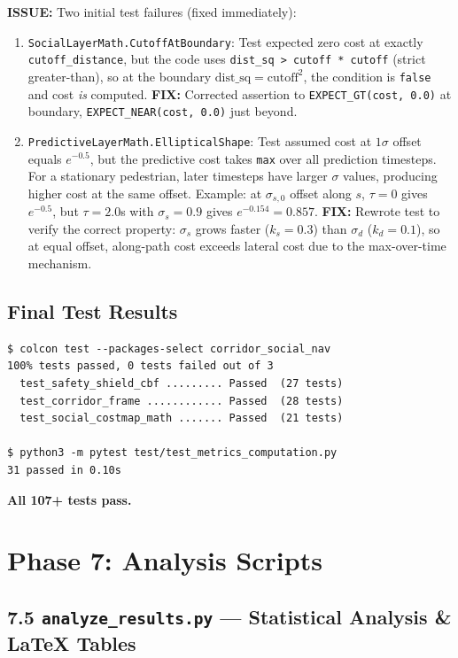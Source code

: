 \documentclass[11pt]{article}
\newcommand{\logentry}[1]{\subsection*{#1}}
\newcommand{\issue}[1]{\textcolor{issuered}{\textbf{ISSUE:} #1}}
\newcommand{\fix}[1]{\textcolor{fixgreen}{\textbf{FIX:} #1}}
\begin{document}
\issue{Two initial test failures (fixed immediately):}
\begin{enumerate}
  \item \texttt{SocialLayerMath.CutoffAtBoundary}: Test expected zero cost at
    exactly \texttt{cutoff\_distance}, but the code uses \texttt{dist\_sq >
    cutoff * cutoff} (strict greater-than), so at the boundary
    $\mathrm{dist\_sq} = \mathrm{cutoff}^2$, the condition is \texttt{false}
    and cost \emph{is} computed. \fix{Corrected assertion to \texttt{EXPECT\_GT(cost, 0.0)}
    at boundary, \texttt{EXPECT\_NEAR(cost, 0.0)} just beyond.}
  \item \texttt{PredictiveLayerMath.EllipticalShape}: Test assumed cost at
    $1\sigma$ offset equals $e^{-0.5}$, but the predictive cost takes
    \texttt{max} over all prediction timesteps. For a stationary pedestrian,
    later timesteps have larger $\sigma$ values, producing higher cost at the
    same offset. Example: at $\sigma_{s,0}$ offset along $s$, $\tau=0$ gives
    $e^{-0.5}$, but $\tau=2.0$s with $\sigma_s = 0.9$ gives $e^{-0.154} = 0.857$.
    \fix{Rewrote test to verify the correct property: $\sigma_s$ grows faster
    ($k_s = 0.3$) than $\sigma_d$ ($k_d = 0.1$), so at equal offset,
    along-path cost exceeds lateral cost due to the max-over-time mechanism.}
\end{enumerate}

\logentry{Final Test Results}
\begin{verbatim}
$ colcon test --packages-select corridor_social_nav
100% tests passed, 0 tests failed out of 3
  test_safety_shield_cbf ......... Passed  (27 tests)
  test_corridor_frame ............ Passed  (28 tests)
  test_social_costmap_math ....... Passed  (21 tests)

$ python3 -m pytest test/test_metrics_computation.py
31 passed in 0.10s
\end{verbatim}

\textbf{All 107+ tests pass.}

\section{Phase 7: Analysis Scripts}

\subsection*{7.5 \texttt{analyze\_results.py} --- Statistical Analysis \& LaTeX Tables}
\end{document}
